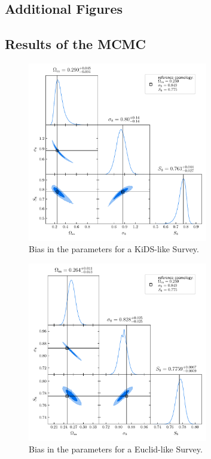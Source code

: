 \documentclass[referee]{aa} %
\renewcommand{\[}{\begin{equation}}
\renewcommand{\]}{\end{equation}}
\begin{document}
\begin{appendix}
\section{Additional Figures}
\subsection{Results of the MCMC}
\begin{figure}[h]
\centering
	\includegraphics[width=0.7\textwidth]{images/obscorr.pdf}
	\caption{Bias in the parameters for a KiDS-like Survey.}
	\label{fig:mcmc_kids}
\end{figure}  
\begin{figure}[h]
\centering
	\includegraphics[width=0.7\textwidth]{images/euclid.pdf}
	\caption{Bias in the parameters for a Euclid-like Survey.}
	\label{fig:mcmc_euclid}
\end{figure}  
\clearpage

\end{appendix}
\end{document}
